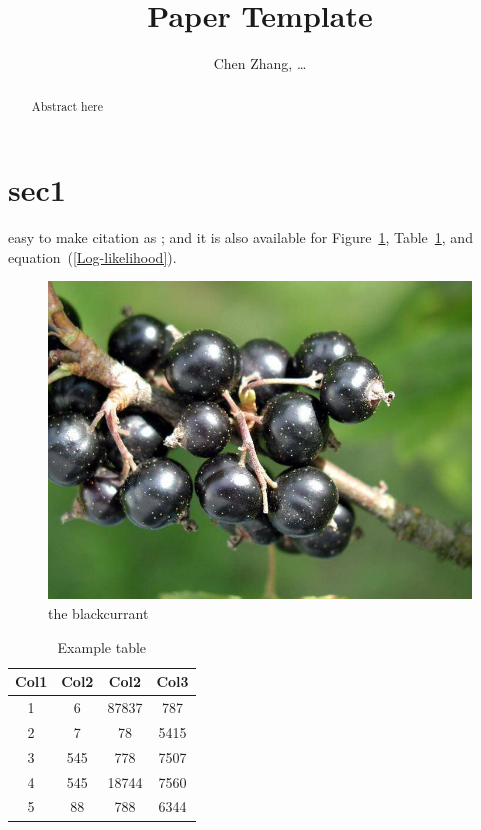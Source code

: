 \documentclass[a4paper, 12pt]{article}
\title{Paper Template}
\author{Chen Zhang, \dots}
\date{}
\newcommand{\myfig}[1]{{\color{black}#1}}
\newcommand{\myeq}[2][e]{{\color{black}#1quation~(\ref{#2})}}
\newcommand{\mytab}[1]{{\color{black}#1}}
\newcommand{\mycite}[1]{{\color{black}\cite{#1}}}
\begin{document}
\maketitle

\begin{abstract}
Abstract here
\end{abstract}

\section{sec1}

easy to make citation as \mycite{sung2021global}; and it is also available for \myfig{Figure~\ref{tag1}}, \mytab{Table~\ref{tag2}}, and \myeq{Log-likelihood}.\par

\begin{figure}[htbp]
	\includegraphics[scale=0.3]{blackcurrant.jpg}
	\caption{the blackcurrant}
	\label{tag1}
\end{figure}

\begin{table}[htbp]
    \begin{center}
    \caption{Example table}
    \begin{tabular}{c|c|c|c}
    \toprule
    Col1 & Col2 & Col2 & Col3 \\
    \midrule
    1 & 6 & 87837 & 787 \\ 
    \hline
    2 & 7 & 78 & 5415 \\
    \hline
    3 & 545 & 778 & 7507 \\
    \hline
    4 & 545 & 18744 & 7560 \\
    \hline
    5 & 88 & 788 & 6344 \\ [1ex] 
    \bottomrule
    \end{tabular}
    \label{tag2}
    \end{center}
\end{table}
\end{document}

